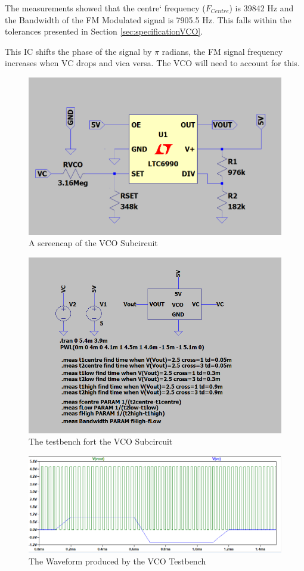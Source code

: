 The measurements showed that the centre` frequency ($F_{Centre}$) is 39842 Hz and the Bandwidth of the FM Modulated signal is 7905.5 Hz.
This falls within the tolerances presented in Section \ref{sec:specificationVCO}.

This IC shifts the phase of the signal by $\pi$ radians, the FM signal frequency increases when VC drops and vica versa. 
The VCO will need to account for this. 

\begin{figure}[H]
    \centering 
    \includegraphics[width=\textwidth]{../Circuits/Images/VCO/Schematic}
    \caption{A screencap of the VCO Subcircuit}
    \label{fig:VCOSchematic}
\end{figure}

\begin{figure}[H]
    \centering 
    \includegraphics[width=\textwidth]{../Circuits/Images/VCO/TestBenchScreencap}
    \caption{The testbench fort the VCO Subcircuit}
    \label{fig:VCOTestBench}
\end{figure}

\begin{figure}[H]
    \centering 
    \includegraphics[width=\textwidth]{../Circuits/Images/VCO/TestBenchWaveform}
    \caption{The Waveform produced by the VCO Testbench}
    \label{fig:VCOTestBenchWaveform}
\end{figure}
